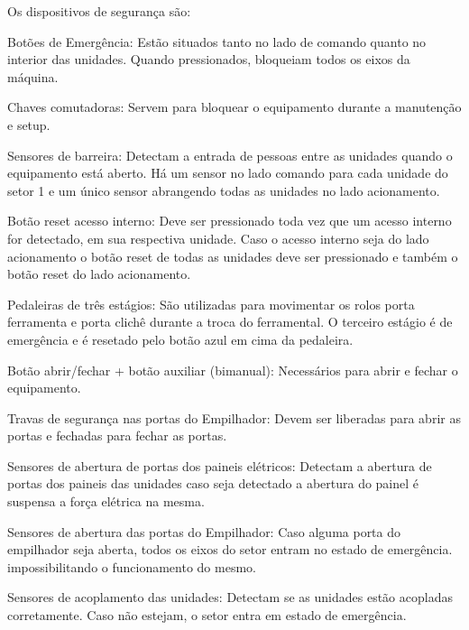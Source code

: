 Os dispositivos de segurança são:




\begin{safetyDevices}

  \item[\ding{\dingNumber}] Botões de Emergência: Estão situados tanto no lado de comando quanto no interior das unidades. Quando pressionados, bloqueiam todos os eixos da máquina.
  \item[\ding{\dingNumber}] Chaves comutadoras: Servem para bloquear o equipamento durante a manutenção e setup.
  \item[\ding{\dingNumber}] Sensores de barreira: Detectam a entrada de pessoas entre as unidades quando o equipamento está aberto. Há um sensor no lado comando para cada 
  unidade do setor 1 e um único sensor abrangendo todas as unidades no lado acionamento.
  \item[\ding{\dingNumber}] Botão reset acesso interno: Deve ser pressionado toda vez que um acesso interno for detectado, em sua respectiva unidade. Caso o acesso 
  interno seja do lado acionamento o botão reset de todas as unidades deve ser pressionado e também o botão reset do lado acionamento.
  \item[\ding{\dingNumber}] Pedaleiras de três estágios: São utilizadas para movimentar os rolos porta ferramenta e porta clichê durante a troca do ferramental.
  O terceiro estágio é de emergência e é resetado pelo botão azul em cima da pedaleira.
  \item[\ding{\dingNumber}] Botão abrir/fechar + botão auxiliar (bimanual): Necessários para abrir e fechar o equipamento.
  \item[\ding{\dingNumber}] Travas de segurança nas portas do Empilhador: Devem ser liberadas para abrir as portas e fechadas para fechar as portas.
  \item[\ding{\dingNumber}] Sensores de abertura de portas dos paineis elétricos: Detectam a abertura de portas dos paineis das unidades caso seja detectado a abertura do
   painel é suspensa a força elétrica na mesma.
  \item[\ding{\dingNumber}] Sensores de abertura das portas do Empilhador: Caso alguma porta do empilhador seja aberta, todos os eixos do setor entram no estado de emergência. 
  impossibilitando o funcionamento do mesmo.
  \item[\ding{\dingNumber}] Sensores de acoplamento das unidades: Detectam se as unidades estão acopladas corretamente. Caso não estejam, o setor entra em estado de emergência.
  
\end{safetyDevices}

